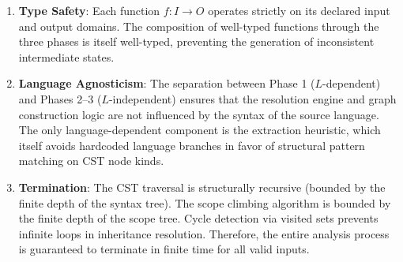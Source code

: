 \begin{enumerate}
  \item \textbf{Type Safety}: Each function $f: I \to O$ operates strictly on its declared input and output domains. The composition of well-typed functions through the three phases is itself well-typed, preventing the generation of inconsistent intermediate states.
  \item \textbf{Language Agnosticism}: The separation between Phase 1 ($L$-dependent) and Phases 2--3 ($L$-independent) ensures that the resolution engine and graph construction logic are not influenced by the syntax of the source language. The only language-dependent component is the extraction heuristic, which itself avoids hardcoded language branches in favor of structural pattern matching on CST node kinds.
  \item \textbf{Termination}: The CST traversal is structurally recursive (bounded by the finite depth of the syntax tree). The scope climbing algorithm is bounded by the finite depth of the scope tree. Cycle detection via visited sets prevents infinite loops in inheritance resolution. Therefore, the entire analysis process is guaranteed to terminate in finite time for all valid inputs.
\end{enumerate}

